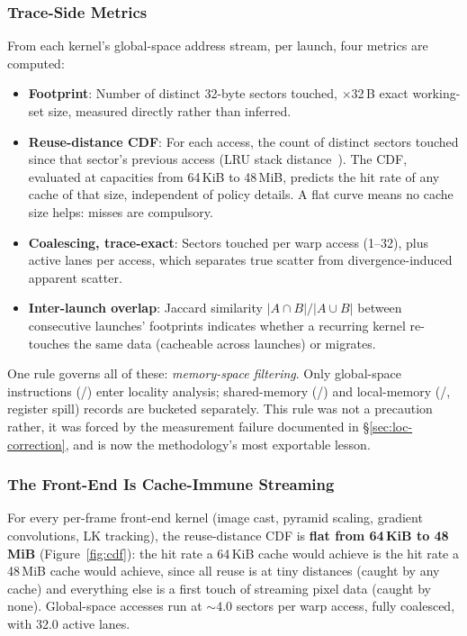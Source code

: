 \subsubsection{Trace-Side Metrics}
\label{sec:loc-metrics}

From each kernel's global-space address stream, per launch, four metrics are computed:

\begin{itemize}
  \item \textbf{Footprint}: Number of distinct 32-byte sectors touched, $\times$32\,B exact working-set size, measured directly rather than inferred.
  \item \textbf{Reuse-distance CDF}: For each access, the count of distinct sectors touched since that sector's previous access (LRU stack distance~\cite{mattson1970stack}). The CDF, evaluated at capacities from 64\,KiB to 48\,MiB, predicts the hit rate of any cache of that size, independent of policy details. A flat curve means no cache size helps: misses are compulsory.
  \item \textbf{Coalescing, trace-exact}: Sectors touched per warp access (1--32), plus active lanes per access, which separates true scatter from divergence-induced apparent scatter.
  \item \textbf{Inter-launch overlap}: Jaccard similarity $|A \cap B|/|A \cup B|$ between consecutive launches' footprints indicates whether a recurring kernel re-touches the same data (cacheable across launches) or migrates.
\end{itemize}

One rule governs all of these: \emph{memory-space filtering}. Only global-space instructions (/) enter locality analysis; shared-memory (/) and local-memory (/, register spill) records are bucketed separately. This rule was not a precaution rather, it was forced by the measurement failure documented in \S\ref{sec:loc-correction}, and is now the methodology's most exportable lesson.

\subsubsection{The Front-End Is Cache-Immune Streaming}
\label{sec:loc-frontend}

For every per-frame front-end kernel (image cast, pyramid scaling, gradient convolutions, LK tracking), the reuse-distance CDF is \textbf{flat from 64\,KiB to 48\,MiB} (Figure~\ref{fig:cdf}): the hit rate a 64\,KiB cache would achieve is the hit rate a 48\,MiB cache would achieve, since all reuse is at tiny distances (caught by any cache) and everything else is a first touch of streaming pixel data (caught by none). Global-space accesses run at $\sim$4.0 sectors per warp access, fully coalesced, with 32.0 active lanes.

